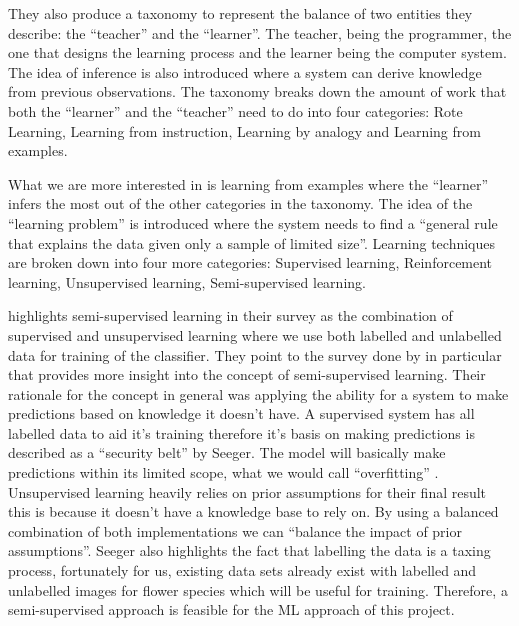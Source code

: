 \documentclass[12pt,a4paper]{report}
\begin{document}
They also produce a taxonomy to represent the balance of two entities they describe: the “teacher” and the “learner”. 
The teacher, being the programmer, the one that designs the learning process and the learner being the computer system. 
The idea of inference is also introduced where a system can derive knowledge from previous observations. The taxonomy 
breaks down the amount of work that both the “learner” and the “teacher” need to do into four categories: Rote Learning,
Learning from instruction, Learning by analogy and Learning from examples.

\par

What we are more interested in is learning from examples where the “learner” infers the most out of the other 
categories in the taxonomy. The idea of the “learning problem” is introduced where the system needs to find a “general 
rule that explains the data given only a sample of limited size”. Learning techniques are broken down into four more 
categories: Supervised learning, Reinforcement learning, Unsupervised learning, Semi-supervised learning.

\par

\citet{zhu2005semi} highlights semi-supervised learning in their survey as the combination of supervised and
unsupervised 
learning where we use both labelled and unlabelled data for training of the classifier. They point to the survey done by
\citet{seeger2000learning} in particular that provides more insight into the concept of semi-supervised 
learning. Their rationale for the concept in general was applying the ability for a system to make predictions based on 
knowledge it doesn't have. A supervised system has all labelled data to aid it's training therefore it's basis on making
predictions is described as a “security belt” by Seeger. The model will basically make predictions within its limited 
scope, what we would call “overfitting” \citep{tom1995}. Unsupervised learning heavily relies on prior assumptions for 
their final result this is because it doesn't have a knowledge base to rely on. By using a balanced combination of both 
implementations we can “balance the impact of prior assumptions”. Seeger also highlights the fact that labelling the 
data is a taxing process, fortunately for us, existing data sets already exist with labelled and unlabelled images for 
flower species which will be useful for training. Therefore, a semi-supervised approach is feasible for the ML approach
of this project.
\end{document}
